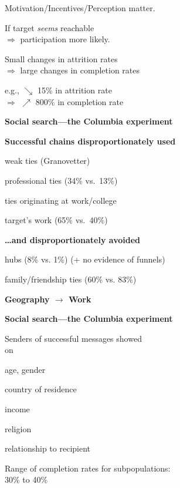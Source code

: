 
  
    
    Motivation/Incentives/Perception matter.
    
    If target \textit{seems} reachable\\
    $\Rightarrow$ participation more likely.
    
    Small changes in attrition rates\\
    $\Rightarrow$ large changes in completion rates
    
    e.g., $\searrow$ 15\% in attrition rate \\
    $\Rightarrow$ $\nearrow$ 800\% in completion rate
  




  \textbf{Social search---the Columbia experiment}

  \textbf{Successful chains disproportionately used}
    
     
      weak ties (Granovetter)
     
      professional ties (34\% vs.\ 13\%)
     
      ties originating at work/college
     
      target's work (65\% vs.\ 40\%)
    
  
  
  \textbf{\ldots and disproportionately avoided}
    
     
      hubs (8\% vs. 1\%) (+ no evidence of funnels)
    
      family/friendship ties (60\% vs. 83\%)
    
  

  \textbf{Geography $\rightarrow$ Work}
    



  \textbf{Social search---the Columbia experiment}


  Senders of successful messages showed\\
   on
  
  
    age, gender
  
    country of residence
   
    income
   
    religion
   
    relationship to recipient
  

  \bigskip

  {
    Range of completion rates for subpopulations: \\
    \mbox{} \hfill 30\% to 40\%
  }



